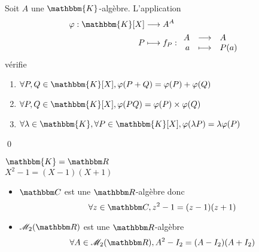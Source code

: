 \begin{thm}
	Soit $A$ une $\mathbbm{K}$-algèbre. L'application \begin{align*}
		\varphi: \mathbbm{K}[X] &\longrightarrow A^A \\
		P &\longmapsto f_P : \begin{array}{rcl}
			A &\longrightarrow& A \\
			a &\longmapsto& P(a)
		\end{array}
	\end{align*} vérifie
	
	\begin{enumerate}
		\item $\forall P,Q \in \mathbbm{K}[X], \varphi(P+Q) = \varphi(P) + \varphi(Q)$
		\item $\forall P,Q \in \mathbbm{K}[X], \varphi(PQ) = \varphi(P) \times \varphi(Q)$
		\item $\forall \lambda \in \mathbbm{K}, \forall P \in \mathbbm{K}[X], \varphi(\lambda P ) = \lambda \varphi(P)$
	\end{enumerate}

	\qed
\end{thm}

\begin{exm}
	$\mathbbm{K} = \R$ \\
	$X^2  - 1 = (X-1)(X+1)$ 
	\begin{itemize}
		\item $\C$ est une $\R$-algèbre donc \[
				\forall z \in \C, z^2-1 = (z-1)(z+1)
			\] 
		\item $\mathcal{M}_2(\R)$ est une $\R$-algèbre \[
			\forall A \in \mathcal{M}_2(\R), A^2 - I_2 = (A-I_2) (A+I_2)
		\] 
	\end{itemize}
\end{exm}
